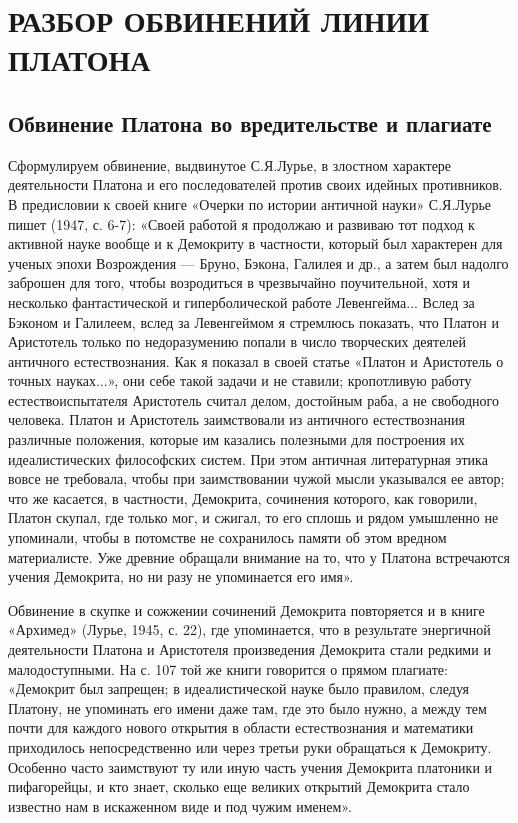 \clearpage

\section{РАЗБОР ОБВИНЕНИЙ ЛИНИИ ПЛАТОНА}

\subsection{Обвинение Платона во вредительстве и плагиате}

Сформулируем обвинение, выдвинутое С.Я.Лурье, в злостном характере
деятельности Платона и его последователей против своих идейных
противников. В предисловии к своей книге «Очерки по истории античной
науки» С.Я.Лурье пишет (1947, с. 6-7): «Своей работой я продолжаю и
развиваю тот подход к активной науке вообще и к Демокриту в частности,
который был характерен для ученых эпохи Возрождения --- Бруно, Бэкона,
Галилея и др., а затем был надолго заброшен для того, чтобы
возродиться в чрезвычайно поучительной, хотя и несколько
фантастической и гиперболической работе Левенгейма... Вслед за Бэконом
и Галилеем, вслед за Левенгеймом я стремлюсь показать, что Платон и
Аристотель только по недоразумению попали в число творческих деятелей
античного естествознания. Как я показал в своей статье «Платон и
Аристотель о точных науках...», они себе такой задачи и не ставили;
кропотливую работу естествоиспытателя Аристотель считал делом,
достойным раба, а не свободного человека. Платон и Аристотель
заимствовали из античного естествознания различные положения, которые
им казались полезными для построения их идеалистических философских
систем. При этом античная литературная этика вовсе не требовала, чтобы
при заимствовании чужой мысли указывался ее автор; что же касается, в
частности, Демокрита, сочинения которого, как говорили, Платон скупал,
где только мог, и сжигал, то его сплошь и рядом умышленно не
упоминали, чтобы в потомстве не сохранилось памяти об этом вредном
материалисте. Уже древние обращали внимание на то, что у Платона
встречаются учения Демокрита, но ни разу не упоминается его имя».

Обвинение в скупке и сожжении сочинений Демокрита повторяется и в
книге «Архимед» (Лурье, 1945, с. 22), где упоминается, что в
результате энергичной деятельности Платона и Аристотеля произведения
Демокрита стали редкими и малодоступными. На с. 107 той же книги
говорится о прямом плагиате: «Демокрит был запрещен; в идеалистической
науке было правилом, следуя Платону, не упоминать его имени даже там,
где это было нужно, а между тем почти для каждого нового открытия в
области естествознания и математики приходилось непосредственно или
через третьи руки обращаться к Демокриту. Особенно часто заимствуют ту
или иную часть учения Демокрита платоники и пифагорейцы, и кто знает,
сколько еще великих открытий Демокрита стало известно нам в искаженном
виде и под чужим именем».

